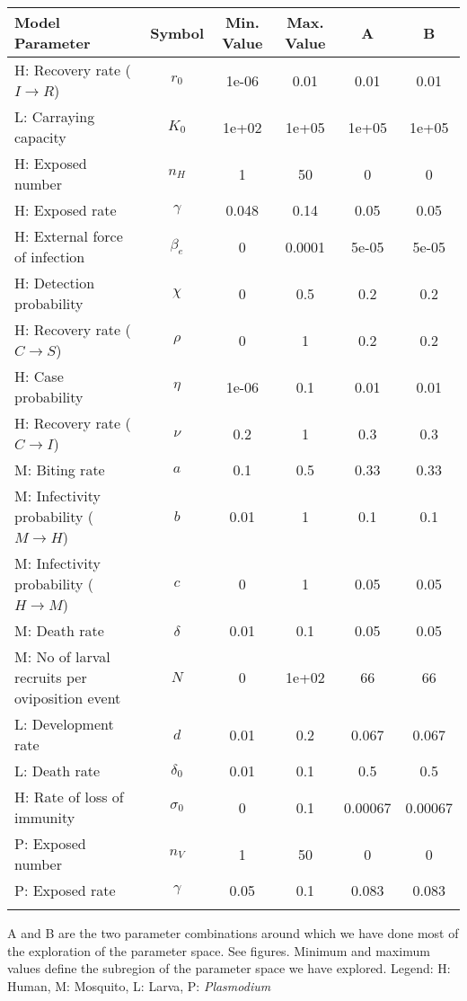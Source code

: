 \begin{table}
\noindent
\begin{tabular}{p{5cm}ccccc}
{\bf Model Parameter} & {\bf Symbol} & {\bf Min. Value} & {\bf Max. Value} & {\bf A} & {\bf B}\\
\hline\hline
  H: Recovery rate ($I \rightarrow R$) & $r_0$ & 1e-06 & 0.01 & 0.01 & 0.01\\
  L: Carraying capacity & $K_0$ & 1e+02 & 1e+05 & 1e+05 & 1e+05\\
  H: Exposed number & $n_H$ &    1 &   50 &    0 &    0\\
  H: Exposed rate & $\gamma$ & 0.048 & 0.14 & 0.05 & 0.05\\
  H: External force of infection & $\beta_e$ &    0 & 0.0001 & 5e-05 & 5e-05\\
  H: Detection probability & $\chi$ &    0 &  0.5 &  0.2 &  0.2\\
  H: Recovery rate ($C \rightarrow S$) & $\rho$ &    0 &    1 &  0.2 &  0.2\\
  H: Case probability & $\eta$ & 1e-06 &  0.1 & 0.01 & 0.01\\
  H: Recovery rate ($C \rightarrow I$) & $\nu$ &  0.2 &    1 &  0.3 &  0.3\\
  M: Biting rate & $a$ &  0.1 &  0.5 & 0.33 & 0.33\\
  M: Infectivity probability ($M \rightarrow H$) & $b$ & 0.01 &    1 &  0.1 &  0.1\\
  M: Infectivity probability ($H \rightarrow M$) & $c$ &    0 &    1 & 0.05 & 0.05\\
  M: Death rate & $\delta$ & 0.01 &  0.1 & 0.05 & 0.05\\
  M: No of larval recruits per oviposition event & $N$ &    0 & 1e+02 &   66 &   66\\
  L: Development rate & $d$ & 0.01 &  0.2 & 0.067 & 0.067\\
  L: Death rate & $\delta_0$ & 0.01 &  0.1 &  0.5 &  0.5\\
  H: Rate of loss of immunity & $\sigma_0$ &    0 &  0.1 & 0.00067 & 0.00067\\
  P: Exposed number & $n_V$ &    1 &   50 &    0 &    0\\
  P: Exposed rate & $\gamma$ & 0.05 &  0.1 & 0.083 & 0.083\\
\hline\hline
\smallskip
\end{tabular}
 A and B are the two parameter combinations around which we have done most of the exploration of the parameter space. See figures. Minimum and maximum values define the subregion of the parameter space we have explored. Legend: {\small H: Human, M: Mosquito, L: Larva, P: {\em Plasmodium}} 
\end{table}
